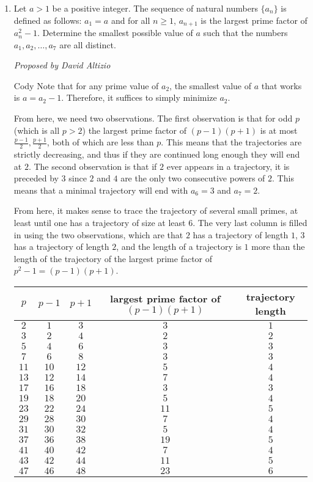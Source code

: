 \documentclass[10pt]{article}
\newcommand{\proposed}[1]
{
\vspace{5pt}
\noindent\textit{Proposed by #1}
}
\begin{document}
\begin{enumerate}
\item Let $a>1$ be a positive integer.  The sequence of natural numbers $\{a_n\}$ is defined as follows: $a_1 = a$ and for all $n\geq 1$, $a_{n+1}$ is the largest prime factor of $a_n^2 - 1$.  Determine the smallest possible value of $a$ such that the numbers $a_1,a_2,\ldots, a_7$ are all distinct.

\proposed{David Altizio}

\iffalse
\begin{soln}{Cody}
Note that for any prime value of $a_2$, the smallest value of $a$ that works is $a=a_2-1$. Therefore, it suffices to simply minimize $a_2$.

From here, we need two observations. The first observation is that for odd $p$ (which is all $p>2$) the largest prime factor of $(p-1)(p+1)$ is at most $\frac{p-1}2,\frac{p+1}2$, both of which are less than $p$. This means that the trajectories are strictly decreasing, and thus if they are continued long enough they will end at $2$. The second observation is that if $2$ ever appears in a trajectory, it is preceded by $3$ since $2$ and $4$ are the only two consecutive powers of $2$. This means that a minimal trajectory will end with $a_6=3$ and $a_7=2$.

From here, it makes sense to trace the trajectory of several small primes, at least until one has a trajectory of size at least $6$. The very last column is filled in using the two observations, which are that $2$ has a trajectory of length $1$, $3$ has a trajectory of length $2$, and the length of a trajectory is $1$ more than the length of the trajectory of the largest prime factor of $p^2-1=(p-1)(p+1)$.

\begin{center}
\begin{tabular}{ccccc}
\hline
$p$ & $p-1$ & $p+1$ & largest prime factor of $(p-1)(p+1)$ & trajectory length \\
\hline
$2$ & $1$ & $3$ & $3$ & $1$ \\
$3$ & $2$ & $4$ & $2$ & $2$ \\
$5$ & $4$ & $6$ & $3$ & $3$ \\
$7$ & $6$ & $8$ & $3$ & $3$ \\
$11$ & $10$ & $12$ & $5$ & $4$ \\
$13$ & $12$ & $14$ & $7$ & $4$ \\
$17$ & $16$ & $18$ & $3$ & $3$ \\
$19$ & $18$ & $20$ & $5$ & $4$ \\
$23$ & $22$ & $24$ & $11$ & $5$ \\
$29$ & $28$ & $30$ & $7$ & $4$ \\
$31$ & $30$ & $32$ & $5$ & $4$ \\
$37$ & $36$ & $38$ & $19$ & $5$ \\
$41$ & $40$ & $42$ & $7$ & $4$ \\
$43$ & $42$ & $44$ & $11$ & $5$ \\
$47$ & $46$ & $48$ & $23$ & $6$ \\
\hline
\end{tabular}
\end{center}


\end{soln}
\end{enumerate}
\end{document}
